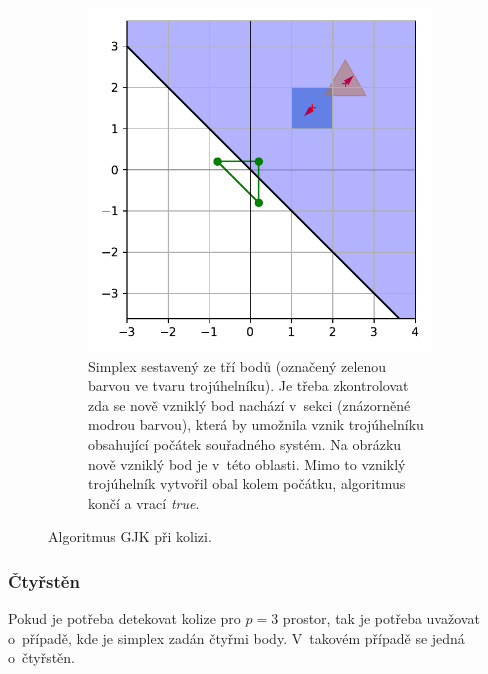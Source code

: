 \begin{figure}
\begin{subfigure}[t]{0.45\textwidth}
\end{subfigure}
\hfill
\begin{subfigure}[t]{0.45\textwidth}
    \centering
    \includegraphics[scale=0.5]{obrazky-figures/gjk/gjk_triangle_2.pdf}
    \caption{Simplex sestavený ze tří bodů (označený zelenou barvou ve tvaru trojúhelníku). Je třeba zkontrolovat zda se nově vzniklý bod nachází v~sekci (znázorněné modrou barvou), která by umožnila vznik trojúhelníku obsahující počátek souřadného systém. Na obrázku nově vzniklý bod je v~této oblasti. Mimo to vzniklý trojúhelník vytvořil obal kolem počátku, algoritmus končí a vrací \emph{true}.}
    \label{fig:gjk_triangle_cols}
     \end{subfigure}
\caption{Algoritmus GJK při kolizi.}
    
\end{figure}


\subsubsection{Čtyřstěn}
Pokud je potřeba detekovat kolize pro $p=3$ prostor, tak je potřeba uvažovat o~případě, kde je simplex zadán čtyřmi body. V~takovém případě se jedná o~čtyřstěn.  


